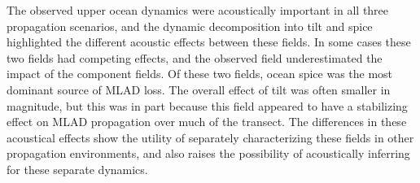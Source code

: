 \documentclass[preprint,NumberedRefs]{JASA}
\begin{document}
The observed upper ocean dynamics were acoustically important in all three propagation scenarios, and the dynamic decomposition into tilt and spice highlighted the different acoustic effects between these fields. In some cases these two fields had competing effects, and the observed field underestimated the impact of the component fields. Of these two fields, ocean spice was the most dominant source of MLAD loss. The overall effect of tilt was often smaller in magnitude, but this was in part because this field appeared to have a stabilizing effect on MLAD propagation over much of the transect. The differences in these acoustical effects show the utility of separately characterizing these fields in other propagation environments, and also raises the possibility of acoustically inferring for these separate dynamics.



\end{document}
